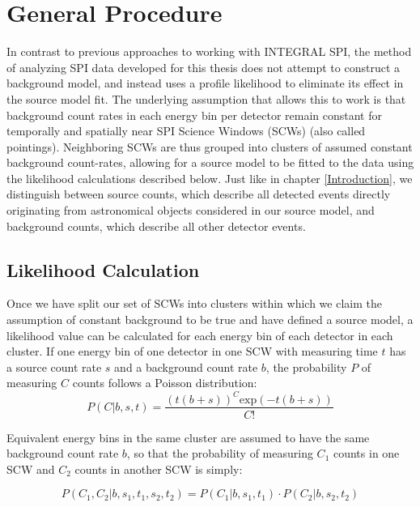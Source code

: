 \documentclass{report}
\begin{document}
\section{General Procedure} \label{General Procedure}
In contrast to previous approaches to working with INTEGRAL SPI, the method of analyzing SPI data developed for this thesis does not attempt to construct a background model, and instead uses a profile likelihood to eliminate its effect in the source model fit. The underlying assumption that allows this to work is that background count rates in each energy bin per detector remain constant for temporally and spatially near SPI Science Windows (SCWs) (also called pointings). Neighboring SCWs are thus grouped into clusters of assumed constant background count-rates, allowing for a source model to be fitted to the data using the likelihood calculations described below. Just like in chapter \ref{Introduction}, we distinguish between source counts, which describe all detected events directly originating from astronomical objects considered in our source model, and background counts, which describe all other detector events.

\subsection{Likelihood Calculation}

Once we have split our set of SCWs into clusters within which we claim the assumption of constant background to be true and have defined a source model, a likelihood value can be calculated for each energy bin of each detector in each cluster. If one energy bin of one detector in one SCW with measuring time $t$ has a source count rate $s$ and a background count rate $b$, the probability $P$ of measuring $C$ counts follows a Poisson distribution:
\begin{equation}
    P(C \vert b, s, t) = \frac{\left( t \left( b + s \right) \right) ^C \text{exp}\left( -t \left( b+s\right)\right)}{C!}
\end{equation}

Equivalent energy bins in the same cluster are assumed to have the same background count rate $b$, so that the probability of measuring $C_1$ counts in one SCW and $C_2$ counts in another SCW is simply:

\begin{equation}
    P(C_1, C_2 \vert b, s_1, t_1, s_2, t_2) = P(C_1 \vert b, s_1, t_1) \cdot P(C_2 \vert b, s_2, t_2)
\end{equation}
\end{document}
